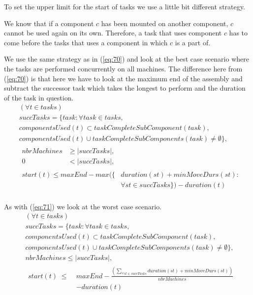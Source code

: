    \noindent To set the upper limit for the start of tasks we use a little bit different strategy.
    
    We know that if a component $c$ has been mounted on another component, $c$ cannot be used again on its own. Therefore, a task that uses component $c$ has to come before the tasks that uses a component in which $c$ is a part of.
    
    We use the same strategy as in (\ref{eq:70}) and look at the best case scenario where the tasks are performed concurrently on all machines. The difference here from (\ref{eq:70}) is that here we have to look at the maximum end of the assembly and subtract the successor task which takes the longest to perform and the duration of the task in question.
  \begin{equation}\label{eq:72}
  \begin{aligned}
  &(\forall t \in tasks) \\
  &succTasks = \{task : \forall task \in tasks,\\
  &componentsUsed(t) \subset taskCompleteSubComponent(task), \\
  &componentsUsed(t) \cup taskCompleteSubComponents(task) \neq \emptyset\}, \\
  &\begin{aligned}
  nbrMachines &\ge |succTasks|,\\
  0 &< |succTasks|,
  \end{aligned}\\
  &\begin{aligned}
  start(t) \le maxEnd - max(\{&duration(st) + minMoveDurs(st) :\\
  &\forall st \in succTasks\}) - duration(t)
  \end{aligned}\\
  \end{aligned}
  \end{equation}

  \noindent  As with (\ref{eq:71}) we look at the worst case scenario.
  \begin{equation}\label{eq:73}
  \begin{aligned}
  &(\forall t \in tasks)\\
  &succTasks = \{task : \forall task \in tasks, \\
  &componentsUsed(t) \subset taskCompleteSubComponent(task), \\
  &componentsUsed(t) \cup taskCompleteSubComponents(task) \neq \emptyset\}, \\
  &nbrMachines \le |succTasks|, \\
  &\begin{aligned}
  start(t) \; \le \; &maxEnd - \frac{\left(\sum_{\forall st \in succTasks}duration(st) + minMoveDurs(st)\right)}{nbrMachines}\\
  &- duration(t)
  \end{aligned}
  \end{aligned}
  \end{equation}

